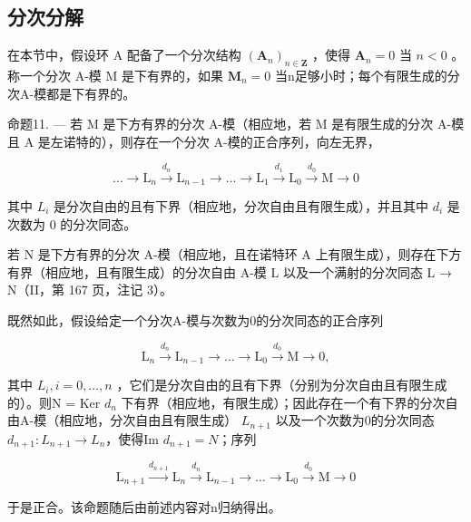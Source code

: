 \subsection{分次分解}

在本节中，假设环 A 配备了一个分次结构 \((\mathbf{A}_n)_{n\in \mathbf{Z}}\) ，使得 \(\mathbf{A}_n = 0\) 当 \(n < 0\) 。称一个分次 A-模 M 是下有界的，如果 \(\mathbf{M}_n = 0\) 当n足够小时；每个有限生成的分次A-模都是下有界的。

命题11. --- 若 M 是下方有界的分次 A-模（相应地，若 M 是有限生成的分次 A-模且 A 是左诺特的），则存在一个分次 A-模的正合序列，向左无界，

\[
\dots \longrightarrow \mathrm{L} _ {n} \xrightarrow {d _ {n}} \mathrm{L} _ {n - 1} \longrightarrow \dots \longrightarrow \mathrm{L} _ {1} \xrightarrow {d _ {1}} \mathrm{L} _ {0} \xrightarrow {d _ {0}} \mathrm{M} \longrightarrow 0
\]

其中 \(L_{i}\) 是分次自由的且有下界（相应地，分次自由且有限生成），并且其中 \(d_{i}\) 是次数为 0 的分次同态。

若 N 是下方有界的分次 A-模（相应地，且在诺特环 A 上有限生成），则存在下方有界（相应地，且有限生成）的分次自由 A-模 L 以及一个满射的分次同态 L → N（II，第 167 页，注记 3）。

既然如此，假设给定一个分次A-模与次数为0的分次同态的正合序列

\[
\mathrm{L} _ {n} \xrightarrow {d _ {n}} \mathrm{L} _ {n - 1} \longrightarrow \dots \longrightarrow \mathrm{L} _ {0} \xrightarrow {d _ {0}} \mathrm{M} \longrightarrow 0,
\]

其中 \(L_{i}, i = 0, \ldots, n\) ，它们是分次自由的且有下界（分别为分次自由且有限生成的）。则N = Ker \(d_{n}\) 下有界（相应地，有限生成）；因此存在一个有下界的分次自由A-模（相应地，分次自由且有限生成） \(L_{n+1}\) 以及一个次数为0的分次同态 \(d_{n+1}: L_{n+1} \to L_{n}\)，使得Im \(d_{n+1} = N\)；序列

\[
\mathrm{L} _ {n + 1} \xrightarrow {d _ {n + 1}} \mathrm{L} _ {n} \xrightarrow {d _ {n}} \mathrm{L} _ {n - 1} \longrightarrow \dots \longrightarrow \mathrm{L} _ {0} \xrightarrow {d _ {0}} \mathrm{M} \longrightarrow 0
\]

于是正合。该命题随后由前述内容对n归纳得出。

